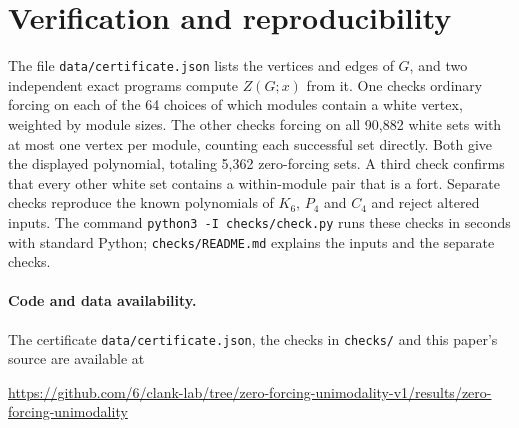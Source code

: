 \documentclass[11pt]{article}
\begin{document}
\section{Verification and reproducibility}

The file \texttt{data/certificate.json} lists the vertices and edges of
$G$, and two independent exact programs compute $Z(G;x)$ from it. One checks ordinary forcing on each of the 64 choices of which modules
contain a white vertex, weighted by module sizes. The other checks forcing
on all 90,882 white sets with at most one vertex per module, counting each
successful set directly. Both give the displayed polynomial, totaling
5,362 zero-forcing sets. A third check confirms that every other white set
contains a within-module pair that is a fort. Separate checks reproduce
the known polynomials of $K_6$, $P_4$ and $C_4$ and reject altered inputs.
The command \texttt{python3 -I checks/check.py} runs these checks in
seconds with standard Python; \texttt{checks/README.md} explains the inputs
and the separate checks.

\paragraph{Code and data availability.}
The certificate \texttt{data/certificate.json}, the checks in
\texttt{checks/} and this paper's source are available at
\begin{center}\footnotesize
\url{https://github.com/6/clank-lab/tree/zero-forcing-unimodality-v1/results/zero-forcing-unimodality}
\end{center}
\end{document}
